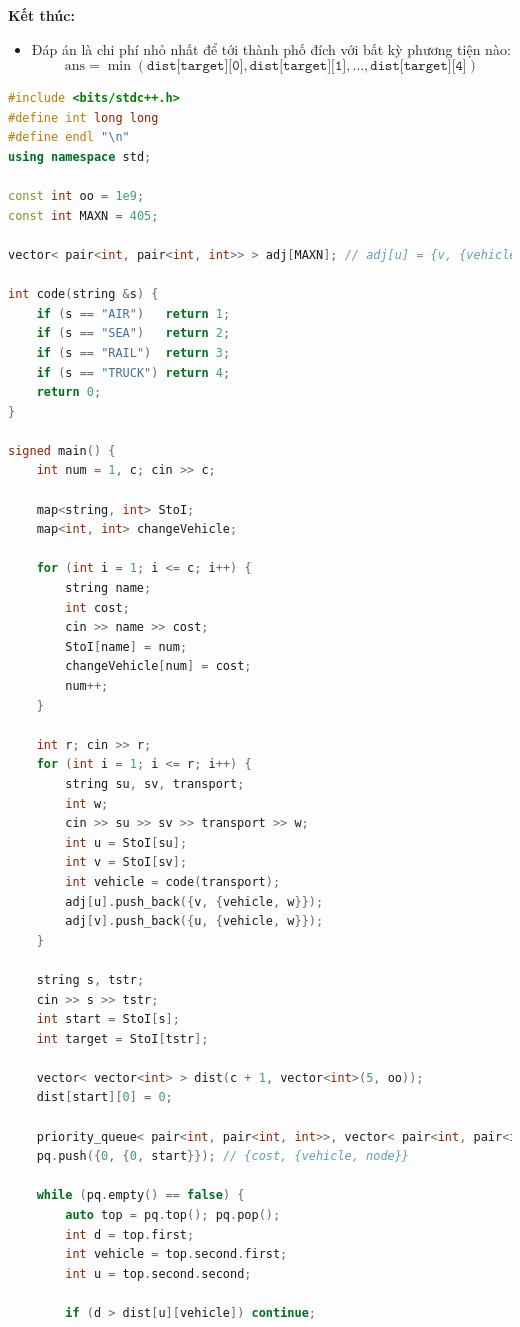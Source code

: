 \documentclass{article}
\begin{document}
\textbf{Kết thúc:}
\begin{itemize}
    \item Đáp án là chi phí nhỏ nhất để tới thành phố đích với bất kỳ phương tiện nào:
    \[
    \text{ans} = \min(\texttt{dist[target][0]}, \texttt{dist[target][1]}, \ldots, \texttt{dist[target][4]})
    \]
\end{itemize}


\begin{lstlisting}[language=C++, caption={Cài đặt}]
#include <bits/stdc++.h>
#define int long long
#define endl "\n"
using namespace std;

const int oo = 1e9;
const int MAXN = 405;

vector< pair<int, pair<int, int>> > adj[MAXN]; // adj[u] = {v, {vehicle, weight}}

int code(string &s) {
    if (s == "AIR")   return 1;
    if (s == "SEA")   return 2;
    if (s == "RAIL")  return 3;
    if (s == "TRUCK") return 4;
    return 0;
}

signed main() {
    int num = 1, c; cin >> c;

    map<string, int> StoI;
    map<int, int> changeVehicle;

    for (int i = 1; i <= c; i++) {
        string name;
        int cost;
        cin >> name >> cost;
        StoI[name] = num;
        changeVehicle[num] = cost;
        num++;
    }

    int r; cin >> r;
    for (int i = 1; i <= r; i++) {
        string su, sv, transport;
        int w;
        cin >> su >> sv >> transport >> w;
        int u = StoI[su];
        int v = StoI[sv];
        int vehicle = code(transport);
        adj[u].push_back({v, {vehicle, w}});
        adj[v].push_back({u, {vehicle, w}});
    }

    string s, tstr;
    cin >> s >> tstr;
    int start = StoI[s];
    int target = StoI[tstr];

    vector< vector<int> > dist(c + 1, vector<int>(5, oo));
    dist[start][0] = 0;

    priority_queue< pair<int, pair<int, int>>, vector< pair<int, pair<int, int>> >, greater< pair<int, pair<int, int>> > > pq;
    pq.push({0, {0, start}}); // {cost, {vehicle, node}}

    while (pq.empty() == false) {
        auto top = pq.top(); pq.pop();
        int d = top.first;
        int vehicle = top.second.first;
        int u = top.second.second;

        if (d > dist[u][vehicle]) continue;


\end{lstlisting}
\end{document}
